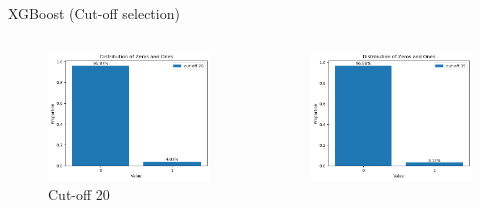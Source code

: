 \documentclass{beamer}
\begin{document}
\begin{frame}{XGBoost (Cut-off selection)}
  \begin{columns}[T]
    \begin{column}{0.33\textwidth}
      \begin{figure}
        \centering
        \includegraphics[width=\textwidth]{distribution_cutoff_20.png}
        \caption{Cut-off 20}
      \end{figure}
    \end{column}
    \begin{column}{0.33\textwidth}
      \begin{figure}
        \centering
        \includegraphics[width=\textwidth]{distribution_cutoff_35.png}

\end{figure}
\end{column}
\end{columns}
\end{frame}
\end{document}
